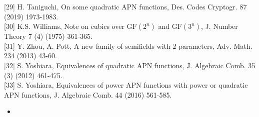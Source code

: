 \documentclass[10pt]{article}
\begin{document}
[29] H. Taniguchi, On some quadratic APN functions, Des. Codes Cryptogr. 87 (2019) 1973-1983.\\[0pt]
[30] K.S. Williams, Note on cubics over $\mathrm{GF}\left(2^{n}\right)$ and $\mathrm{GF}\left(3^{n}\right)$, J. Number Theory 7 (4) (1975) 361-365.\\[0pt]
[31] Y. Zhou, A. Pott, A new family of semifields with 2 parameters, Adv. Math. 234 (2013) 43-60.\\[0pt]
[32] S. Yoshiara, Equivalences of quadratic APN functions, J. Algebraic Comb. 35 (3) (2012) 461-475.\\[0pt]
[33] S. Yoshiara, Equivalences of power APN functions with power or quadratic APN functions, J. Algebraic Comb. 44 (2016) 561-585.

\begin{itemize}
  \item 
\end{itemize}
\end{document}
